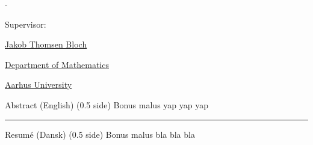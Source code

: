 \begin{titlingpage}
\begin{adjustwidth*}{\frontpagecorrection-2cm}{-\frontpagecorrection-2cm}
    \bigskip

    \fontsize{14pt}{18pt}\selectfont
    \par
    \par

    \vfill

    Supervisor: \par
    \href{https://pure.au.dk/portal/en/persons/jabl%40econ.au.dk}{Jakob Thomsen Bloch} \par

    \vfill

    \fontsize{12pt}{14.5pt}\selectfont
    \href{https://www.math.au.dk/}{Department of Mathematics}\par
    \href{https://www.au.dk/}{Aarhus University}

  \end{adjustwidth*}
\end{titlingpage}


\thispagestyle{chapter}

\begin{multiabstract}{Abstract (English) (0.5 side)}
\noindent Bonus malus yap yap yap

\end{multiabstract}


\plainbreak{2}

\begin{multiabstract}{Resumé (Dansk) (0.5 side)}
\noindent Bonus malus bla bla bla

\end{multiabstract}

